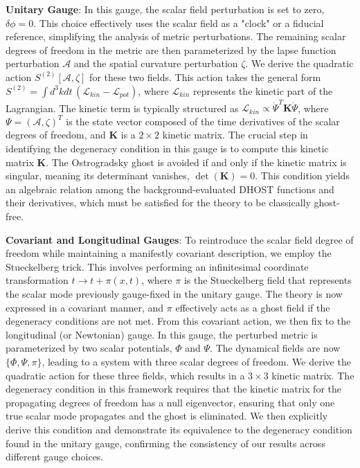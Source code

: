 \documentclass[twocolumn]{aastex631}
\begin{document}
\textbf{Unitary Gauge}: In this gauge, the scalar field perturbation is set to zero, $\delta\phi=0$. This choice effectively uses the scalar field as a "clock" or a fiducial reference, simplifying the analysis of metric perturbations. The remaining scalar degrees of freedom in the metric are then parameterized by the lapse function perturbation $\mathcal{A}$ and the spatial curvature perturbation $\zeta$. We derive the quadratic action $S^{(2)}[\mathcal{A}, \zeta]$ for these two fields. This action takes the general form $S^{(2)} = \int d^3k dt \, \left( \mathcal{L}_{kin} - \mathcal{L}_{pot} \right)$, where $\mathcal{L}_{kin}$ represents the kinetic part of the Lagrangian. The kinetic term is typically structured as $\mathcal{L}_{kin} \propto \dot{\Psi}^T \mathbf{K} \dot{\Psi}$, where $\Psi = (\mathcal{A}, \zeta)^T$ is the state vector composed of the time derivatives of the scalar degrees of freedom, and $\mathbf{K}$ is a $2 \times 2$ kinetic matrix. The crucial step in identifying the degeneracy condition in this gauge is to compute this kinetic matrix $\mathbf{K}$. The Ostrogradsky ghost is avoided if and only if the kinetic matrix is singular, meaning its determinant vanishes, $\det(\mathbf{K}) = 0$. This condition yields an algebraic relation among the background-evaluated DHOST functions and their derivatives, which must be satisfied for the theory to be classically ghost-free.

\textbf{Covariant and Longitudinal Gauges}: To reintroduce the scalar field degree of freedom while maintaining a manifestly covariant description, we employ the Stueckelberg trick. This involves performing an infinitesimal coordinate transformation $t \to t + \pi(x,t)$, where $\pi$ is the Stueckelberg field that represents the scalar mode previously gauge-fixed in the unitary gauge. The theory is now expressed in a covariant manner, and $\pi$ effectively acts as a ghost field if the degeneracy conditions are not met. From this covariant action, we then fix to the longitudinal (or Newtonian) gauge. In this gauge, the perturbed metric is parameterized by two scalar potentials, $\Phi$ and $\Psi$. The dynamical fields are now $\{\Phi, \Psi, \pi\}$, leading to a system with three scalar degrees of freedom. We derive the quadratic action for these three fields, which results in a $3 \times 3$ kinetic matrix. The degeneracy condition in this framework requires that the kinetic matrix for the propagating degrees of freedom has a null eigenvector, ensuring that only one true scalar mode propagates and the ghost is eliminated. We then explicitly derive this condition and demonstrate its equivalence to the degeneracy condition found in the unitary gauge, confirming the consistency of our results across different gauge choices.
\end{document}
